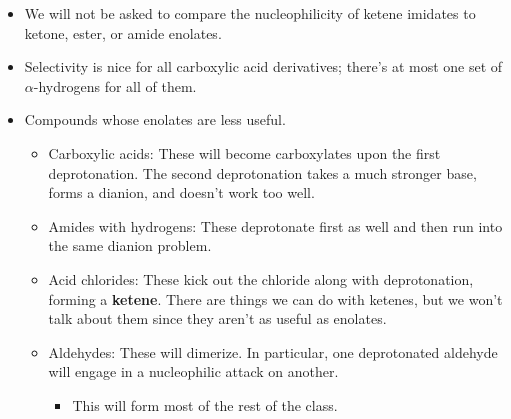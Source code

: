 \documentclass[../notes.tex]{subfiles}
\begin{document}
\begin{itemize}
\begin{itemize}
    \end{itemize}
    \item We will not be asked to compare the nucleophilicity of ketene imidates to ketone, ester, or amide enolates.
    \item Selectivity is nice for all carboxylic acid derivatives; there's at most one set of $\alpha$-hydrogens for all of them.
    \item Compounds whose enolates are less useful.
    \begin{itemize}
        \item Carboxylic acids: These will become carboxylates upon the first deprotonation. The second deprotonation takes a much stronger base, forms a dianion, and doesn't work too well.
        \item Amides with hydrogens: These deprotonate first as well and then run into the same dianion problem.
        \item Acid chlorides: These kick out the chloride along with deprotonation, forming a \textbf{ketene}. There are things we can do with ketenes, but we won't talk about them since they aren't as useful as enolates.
        \item Aldehydes: These will dimerize. In particular, one deprotonated aldehyde will engage in a nucleophilic attack on another.
        \begin{itemize}
            \item This will form most of the rest of the class.
        \end{itemize}
    \end{itemize}
\end{itemize}
\end{document}
